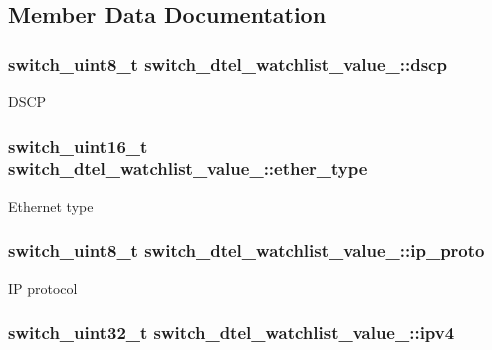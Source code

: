 \subsection{Member Data Documentation}
\hypertarget{unionswitch__dtel__watchlist__value___ae31223b6628267d278ea12b2b3051b0f}{
\subsubsection[{dscp}]{\setlength{\rightskip}{0pt plus 5cm}switch\+\_\+uint8\+\_\+t switch\+\_\+dtel\+\_\+watchlist\+\_\+value\+\_\+\+::dscp}}\label{unionswitch__dtel__watchlist__value___ae31223b6628267d278ea12b2b3051b0f}
D\+S\+C\+P \hypertarget{unionswitch__dtel__watchlist__value___ac0d010dabd7a4bcb6acc3255130f7b18}{
\subsubsection[{ether\+\_\+type}]{\setlength{\rightskip}{0pt plus 5cm}switch\+\_\+uint16\+\_\+t switch\+\_\+dtel\+\_\+watchlist\+\_\+value\+\_\+\+::ether\+\_\+type}}\label{unionswitch__dtel__watchlist__value___ac0d010dabd7a4bcb6acc3255130f7b18}
Ethernet type \hypertarget{unionswitch__dtel__watchlist__value___abd6fb65d21280fe04ef06a67db571f69}{
\subsubsection[{ip\+\_\+proto}]{\setlength{\rightskip}{0pt plus 5cm}switch\+\_\+uint8\+\_\+t switch\+\_\+dtel\+\_\+watchlist\+\_\+value\+\_\+\+::ip\+\_\+proto}}\label{unionswitch__dtel__watchlist__value___abd6fb65d21280fe04ef06a67db571f69}
I\+P protocol \hypertarget{unionswitch__dtel__watchlist__value___a1fd7f57b1a99ed89273069d12a3d6c64}{
\subsubsection[{ipv4}]{\setlength{\rightskip}{0pt plus 5cm}switch\+\_\+uint32\+\_\+t switch\+\_\+dtel\+\_\+watchlist\+\_\+value\+\_\+\+::ipv4}}\label{unionswitch__dtel__watchlist__value___a1fd7f57b1a99ed89273069d12a3d6c64}
